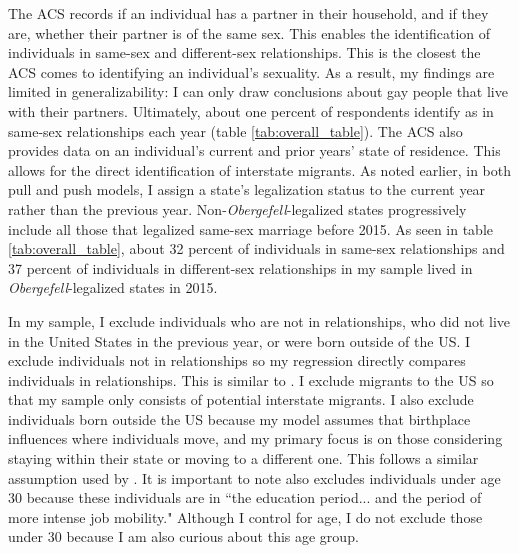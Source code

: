 \documentclass[12pt,letterpaper]{article}
\begin{document}
The ACS records if an individual has a partner in their household, and if they are, whether their partner is of the same sex. This enables the identification of individuals in same-sex and different-sex relationships. This is the closest the ACS comes to identifying an individual's sexuality. As a result, my findings are limited in generalizability: I can only draw conclusions about gay people that live with their partners. Ultimately, about one percent of respondents identify as in same-sex relationships each year (table \ref{tab:overall_table}). The ACS also provides data on an individual's current and prior years' state of residence. This allows for the direct identification of interstate migrants. As noted earlier, in both pull and push models, I assign a state's legalization status to the current year rather than the previous year. Non-\textit{Obergefell}-legalized states progressively include all those that legalized same-sex marriage before 2015. As seen in table \ref{tab:overall_table}, about 32 percent of individuals in same-sex relationships and 37 percent of individuals in different-sex relationships in my sample lived in \textit{Obergefell}-legalized states in 2015.
\FloatBarrier


In my sample, I exclude individuals who are not in relationships, who did not live in the United States in the previous year, or were born outside of the US. I exclude individuals not in relationships so my regression directly compares individuals in relationships. This is similar to \citet{1}. I exclude migrants to the US so that my sample only consists of potential interstate migrants. I also exclude individuals born outside the US because my model assumes that birthplace influences where individuals move, and my primary focus is on those considering staying within their state or moving to a different one. This follows a similar assumption used by \citet{12}. It is important to note \citet[446]{1} also excludes individuals under age 30 because these individuals are in ``the education period... and the period of more intense job mobility." Although I control for age, I do not exclude those under 30 because I am also curious about this age group.
\end{document}
